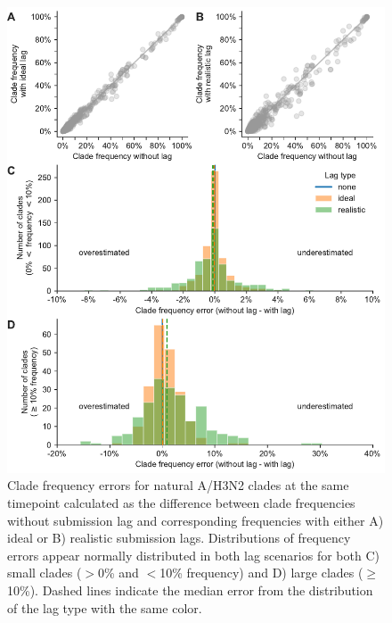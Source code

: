 \documentclass[9pt,lineno]{elife}
\begin{document}
\begin{figure}[htb!]
\includegraphics[width=\linewidth]{figures/h3n2_current_frequency_errors_by_delay}
\caption{Clade frequency errors for natural A/H3N2 clades at the same timepoint calculated as the difference between clade frequencies without submission lag and corresponding frequencies with either A) ideal or B) realistic submission lags.
Distributions of frequency errors appear normally distributed in both lag scenarios for both C) small clades ($>$0\% and $<$10\% frequency) and D) large clades ($\ge$10\%).
Dashed lines indicate the median error from the distribution of the lag type with the same color.}
\label{fig:h3n2_current_clade_frequency_errors}
%

\end{figure}
\end{document}

